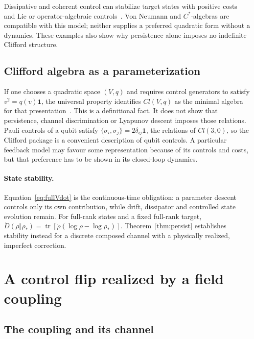 \documentclass[aps,pre,onecolumn,superscriptaddress,floatfix,longbibliography]{revtex4-2}
\begin{document}
Dissipative and coherent control can stabilize target states with positive costs and Lie or operator-algebraic controls~\cite{Verstraete2009,Diehl2008,TicozziViola2008,Mirrahimi2005}. Von Neumann and $C^*$-algebras are compatible with this model; neither supplies a preferred quadratic form without a dynamics. These examples also show why persistence alone imposes no indefinite Clifford structure.

\subsection{Clifford algebra as a parameterization}

If one chooses a quadratic space $(V,q)$ and requires control generators to satisfy $v^2=q(v)\mathbf 1$, the universal property identifies $Cl(V,q)$ as the minimal algebra for that presentation~\cite{Hestenes1966}. This is a definitional fact. It does not show that persistence, channel discrimination or Lyapunov descent imposes those relations. Pauli controls of a qubit satisfy $\{\sigma_i,\sigma_j\}=2\delta_{ij}\mathbf 1$, the relations of $Cl(3,0)$, so the Clifford package is a convenient description of qubit controls. A particular feedback model may favour some representation because of its controls and costs, but that preference has to be shown in its closed-loop dynamics.

\paragraph{State stability.}\label{sec:toymodel}
Equation~\eqref{eq:fullVdot} is the continuous-time obligation: a parameter descent controls only its own contribution, while drift, dissipator and controlled state evolution remain. For full-rank states and a fixed full-rank target,
$\dot D(\rho\Vert\rho_*)=\operatorname{tr}[\dot\rho(\log\rho-\log\rho_*)]$.
Theorem~\ref{thm:persist} establishes stability instead for a discrete composed channel with a physically realized, imperfect correction.

\section{A control flip realized by a field coupling}
\label{sec:actuator}

\subsection{The coupling and its channel}
\end{document}
